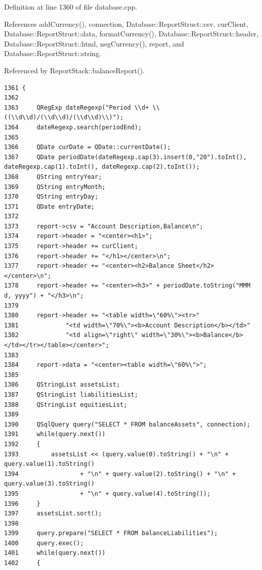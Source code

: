 Definition at line 1360 of file database.cpp.

References add\-Currency(), connection, Database::Report\-Struct::csv, cur\-Client, Database::Report\-Struct::data, format\-Currency(), Database::Report\-Struct::header, Database::Report\-Struct::html, neg\-Currency(), report, and Database::Report\-Struct::string.

Referenced by Report\-Stack::balance\-Report().

\footnotesize\begin{verbatim}1361 {
1362 
1363     QRegExp dateRegexp("Period \\d+ \\((\\d\\d)/(\\d\\d)/(\\d\\d)\\)");
1364     dateRegexp.search(periodEnd);
1365     
1366     QDate curDate = QDate::currentDate();
1367     QDate periodDate(dateRegexp.cap(3).insert(0,"20").toInt(), dateRegexp.cap(1).toInt(), dateRegexp.cap(2).toInt());
1368     QString entryYear;
1369     QString entryMonth;
1370     QString entryDay;
1371     QDate entryDate;
1372 
1373     report->csv = "Account Description,Balance\n";
1374     report->header = "<center><h1>";
1375     report->header += curClient;
1376     report->header += "</h1></center>\n";
1377     report->header += "<center><h2>Balance Sheet</h2></center>\n";
1378     report->header += "<center><h3>" + periodDate.toString("MMM d, yyyy") + "</h3>\n";
1379 
1380     report->header += "<table width=\"60%\"><tr>"
1381             "<td width=\"70%\"><b>Account Description</b></td>"
1382             "<td align=\"right\" width=\"30%\"><b>Balance</b></td></tr></table></center>";
1383 
1384     report->data = "<center><table width=\"60%\">";
1385 
1386     QStringList assetsList;
1387     QStringList liabilitiesList;
1388     QStringList equitiesList;
1389 
1390     QSqlQuery query("SELECT * FROM balanceAssets", connection);
1391     while(query.next())
1392     {
1393         assetsList << (query.value(0).toString() + "\n" + query.value(1).toString()
1394                 + "\n" + query.value(2).toString() + "\n" + query.value(3).toString()
1395                 + "\n" + query.value(4).toString());
1396     }
1397     assetsList.sort();
1398 
1399     query.prepare("SELECT * FROM balanceLiabilities");
1400     query.exec();
1401     while(query.next())
1402     {

\end{verbatim}
